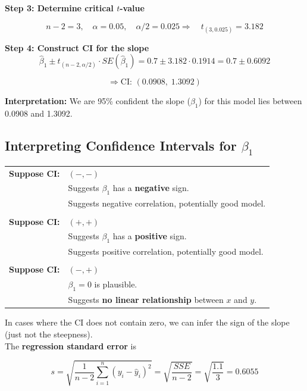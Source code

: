 \begin{example}[continued]
\vspace{1em}
\textbf{Step 3: Determine critical $t$-value}

\[
n - 2 = 3, \quad \alpha = 0.05, \quad \alpha/2 = 0.025
\Rightarrow \quad
t_{(3, 0.025)} = 3.182
\]

\vspace{1em}
\textbf{Step 4: Construct CI for the slope}
\[
\hat{\beta}_1 \pm t_{(n-2, \alpha/2)} \cdot SE(\hat{\beta}_1)
= 0.7 \pm 3.182 \cdot 0.1914 = 0.7 \pm 0.6092
\]

\[
\Rightarrow \text{CI: } (0.0908, \; 1.3092)
\]

\vspace{1em}
\textbf{Interpretation:}  
We are 95\% confident the slope ($\beta_1$) for this model lies between 0.0908 and 1.3092.
\end{example}
\subsection*{Interpreting Confidence Intervals for $\beta_1$}

\begin{center}
\begin{tabular}{rl}
\textbf{Suppose CI:} & $(-, -)$ \\
& Suggests $\beta_1$ has a \textbf{negative} sign. \\
& Suggests negative correlation, potentially good model. \\
\\
\textbf{Suppose CI:} & $(+, +)$ \\
& Suggests $\beta_1$ has a \textbf{positive} sign. \\
& Suggests positive correlation, potentially good model. \\
\\
\textbf{Suppose CI:} & $(-, +)$ \\
& $\beta_1 = 0$ is plausible. \\
& Suggests \textbf{no linear relationship} between $x$ and $y$.
\end{tabular}
\end{center}

\vspace{0.5em}
In cases where the CI does not contain zero, we can infer the sign of the slope (just not the steepness).\\

The \textbf{regression standard error} is

\[
s = \sqrt{\frac{1}{n - 2} \sum_{i=1}^n (y_i - \hat{y}_i)^2} = \sqrt{\frac{SSE}{n - 2}} = \sqrt{\frac{1.1}{3}} = 0.6055
\]


